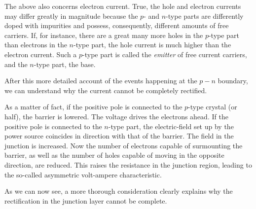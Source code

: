 The above also concerns electron current. True, the hole and electron currents may differ greatly in magnitude because the $p$- and $n$-type parts are differently doped with impurities and possess, consequently, different amounts of free carriers. If, for instance, there are a great many more holes in the $p$-type part than electrons in the $n$-type part, the hole current is much higher than the electron current. Such a $p$-type part is called the \emph{emitter} of free current carriers, and the $n$-type part, the base.

After this more detailed account of the events happening at the $p\!-\!n$ boundary, we can understand why the current cannot be completely rectified.

As a matter of fact, if the positive pole is connected to the $p$-type crystal (or half), the barrier is lowered. The voltage drives the electrons ahead. If the positive pole is connected to the $n$-type part, the electric-field set up by the power source coincides in direction with that of the barrier. The field in the junction is increased. Now the number of electrons capable of surmounting the barrier, as well as the number of holes capable of moving in the opposite direction, are reduced. This raises the resistance in the junction region, leading to the so-called asymmetric volt-ampere characteristic.

As we can now see, a more thorough consideration clearly explains why the rectification in the junction layer cannot be complete.









